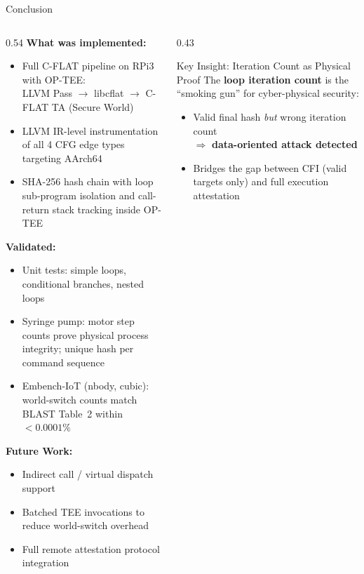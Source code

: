 \documentclass[aspectratio=169]{beamer}
\begin{document}
\begin{frame}{Conclusion}
\begin{columns}[T]

\begin{column}{0.54\textwidth}
  \textbf{What was implemented:}
  \begin{itemize}
    \item Full C-FLAT pipeline on RPi3 with OP-TEE: \\
          LLVM Pass $\to$ libcflat $\to$ C-FLAT TA (Secure World)
    \item LLVM IR-level instrumentation of all 4 CFG edge types
          targeting AArch64
    \item SHA-256 hash chain with loop sub-program isolation and
          call-return stack tracking inside OP-TEE
  \end{itemize}

  \medskip
  \textbf{Validated:}
  \begin{itemize}
    \item Unit tests: simple loops, conditional branches, nested loops
    \item Syringe pump: motor step counts prove physical process integrity;
          unique hash per command sequence
    \item Embench-IoT (nbody, cubic): world-switch counts match
          BLAST Table~2 within $< 0.0001\%$
  \end{itemize}

  \medskip
  \textbf{Future Work:}
  \begin{itemize}
    \item Indirect call / virtual dispatch support
    \item Batched TEE invocations to reduce world-switch overhead
    \item Full remote attestation protocol integration
  \end{itemize}
\end{column}

\begin{column}{0.43\textwidth}

  \begin{block}{Key Insight: Iteration Count as Physical Proof}
    \smallskip
    The \textbf{loop iteration count} is the ``smoking gun'' for
    cyber-physical security:
    \begin{itemize}\small
      \item Valid final hash \emph{but} wrong iteration count\\
            $\Rightarrow$ \textbf{data-oriented attack detected}
      \item Bridges the gap between CFI (valid targets only)
            and full execution attestation
    \end{itemize}
  \end{block}


\end{column}
\end{columns}
\end{frame}
\end{document}
